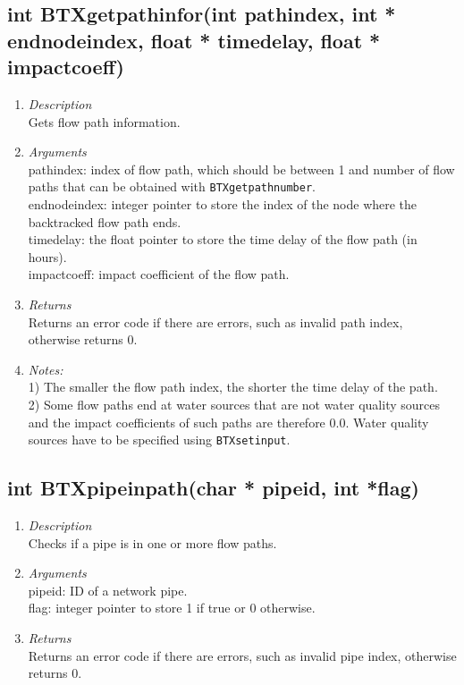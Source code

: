 \documentclass[12pt,letterpaper]{article}
\begin{document}
\subsection*{int BTXgetpathinfor(int pathindex, int * endnodeindex, float * timedelay, float * impactcoeff)}
\begin{enumerate}
\item {\it Description}\\Gets flow path information.
\item {\it Arguments}\\
pathindex: index of flow path, which should be between 1 and number
of flow paths that can be obtained with
\texttt{BTXgetpathnumber}.\\endnodeindex: integer pointer to store
the index of the node where the backtracked flow path ends.
\\timedelay: the float pointer to store the time delay of the flow
path (in hours).\\impactcoeff: impact coefficient of the flow path.
\item {\it Returns}\\Returns an error code if there are errors, such as invalid path index, otherwise returns 0.
\item{\it Notes:}\\1) The smaller the flow path index, the shorter
the time delay of the path.\\2) Some flow paths end at water sources
that are not water quality sources and the impact coefficients of
such paths are therefore 0.0. Water quality sources have to be
specified using \texttt{BTXsetinput}.
\end{enumerate}

\subsection*{int BTXpipeinpath(char * pipeid, int *flag)}
\begin{enumerate}
\item {\it Description}\\Checks if a pipe is in one or more flow paths.
\item{\it Arguments}\\pipeid: ID of a network pipe.\\flag:
integer pointer to store 1 if true or 0 otherwise.
\item {\it Returns}\\Returns an error code if there are errors, such as invalid pipe index, otherwise returns 0.
\end{enumerate}
\end{document}
